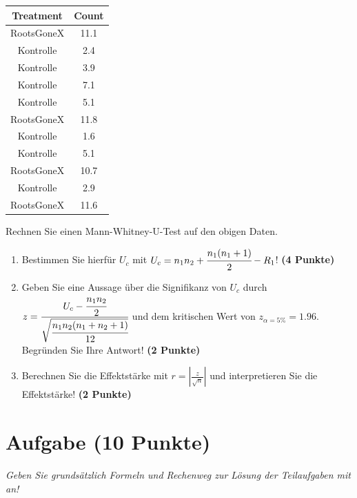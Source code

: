 \documentclass[a4paper, 9pt]{scrartcl}\usepackage[]{graphicx}\usepackage[]{xcolor}
\newenvironment{knitrout}{}{} %
\begin{document}
\begin{knitrout}
\color{fgcolor}\begin{table}[!h]
\centering
\begin{tabular}{cc}
\toprule
Treatment & Count\\
\midrule
RootsGoneX & 11.1\\
Kontrolle & 2.4\\
Kontrolle & 3.9\\
Kontrolle & 7.1\\
Kontrolle & 5.1\\
\addlinespace
RootsGoneX & 11.8\\
Kontrolle & 1.6\\
Kontrolle & 5.1\\
RootsGoneX & 10.7\\
Kontrolle & 2.9\\
\addlinespace
RootsGoneX & 11.6\\
\bottomrule
\end{tabular}
\end{table}

\end{knitrout}

Rechnen Sie einen Mann-Whitney-U-Test auf den obigen Daten.

\begin{enumerate}
\item Bestimmen Sie hierf{\"u}r $U_c$ mit $U_c = n_1n_2 +
  \cfrac{n_1(n_1+1)}{2}-R_1$! \textbf{(4 Punkte)} 
\item Geben Sie eine Aussage {\"u}ber die Signifikanz von $U_c$ durch
  $z = \cfrac{U_c -
    \cfrac{n_1n_2}{2}}{\sqrt{\cfrac{n_1n_2(n_1+n_2+1)}{12}}}$ und dem
  kritischen Wert von $z_{\alpha = 5\%} = 1.96$. Begr{\"u}nden Sie Ihre
  Antwort! \textbf{(2 Punkte)}
\item Berechnen Sie die Effektst{\"a}rke mit $r = |\frac{z}{\sqrt{n}}| $ und
  interpretieren Sie die Effektst{\"a}rke! \textbf{(2 Punkte)} 
\end{enumerate} 
\clearpage

\section{Aufgabe \hfill (10 Punkte)}

\textit{Geben Sie grunds{\"a}tzlich Formeln und Rechenweg zur L{\"o}sung der
  Teilaufgaben mit an!} \\[1Ex]
\end{document}
